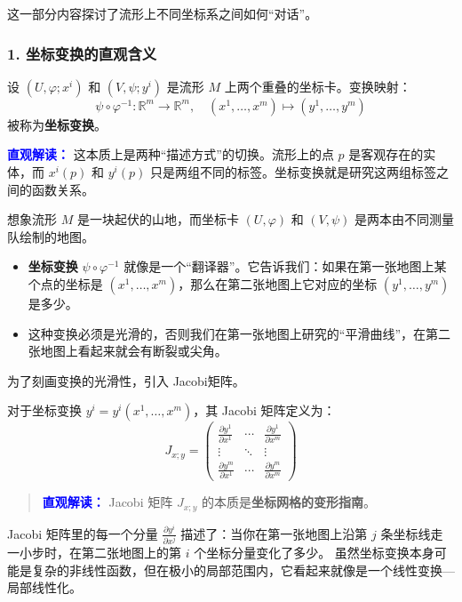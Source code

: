 \begin{myremark}
这一部分内容探讨了流形上不同坐标系之间如何“对话”。
\subsubsection*{1. 坐标变换的直观含义}

设 $(U, \varphi; x^i)$ 和 $(V, \psi; y^i)$ 是流形 $M$ 上两个重叠的坐标卡。变换映射：
$$
\psi \circ \varphi^{-1}: \mathbb{R}^m \to \mathbb{R}^m, \quad (x^1, \dots, x^m) \mapsto (y^1, \dots, y^m)
$$
被称为\textbf{坐标变换}。

\textbf{\textcolor{blue}{直观解读：}}
这本质上是两种“描述方式”的切换。流形上的点 $p$ 是客观存在的实体，而 $x^i(p)$ 和 $y^i(p)$ 只是两组不同的标签。坐标变换就是研究这两组标签之间的函数关系。

想象流形 $M$ 是一块起伏的山地，而坐标卡 $(U, \varphi)$ 和 $(V, \psi)$ 是两本由不同测量队绘制的地图。
\begin{itemize}
\item \textbf{坐标变换} $\psi \circ \varphi^{-1}$ 就像是一个“翻译器”。它告诉我们：如果在第一张地图上某个点的坐标是 $(x^1, \dots, x^m)$，那么在第二张地图上它对应的坐标 $(y^1, \dots, y^m)$ 是多少。
\item 这种变换必须是光滑的，否则我们在第一张地图上研究的“平滑曲线”，在第二张地图上看起来就会有断裂或尖角。
\end{itemize}

为了刻画变换的光滑性，引入 Jacobi矩阵。 

对于坐标变换 $y^i = y^i(x^1, \dots, x^m)$，其 Jacobi 矩阵定义为：
$$
J_{x;y} = \begin{pmatrix}
\frac{\partial y^1}{\partial x^1} & \cdots & \frac{\partial y^1}{\partial x^m} \\
\vdots & \ddots & \vdots \\
\frac{\partial y^m}{\partial x^1} & \cdots & \frac{\partial y^m}{\partial x^m}
\end{pmatrix}
$$

\begin{quote}
\textbf{\textcolor{blue}{直观解读：}}
Jacobi 矩阵 $J_{x;y}$ 的本质是\textbf{坐标网格的变形指南}。
\end{quote}

Jacobi 矩阵里的每一个分量 $\frac{\partial y^i}{\partial x^j}$ 描述了：当你在第一张地图上沿第 $j$ 条坐标线走一小步时，在第二张地图上的第 $i$ 个坐标分量变化了多少。
虽然坐标变换本身可能是复杂的非线性函数，但在极小的局部范围内，它看起来就像是一个线性变换---局部线性化。


\end{myremark}
